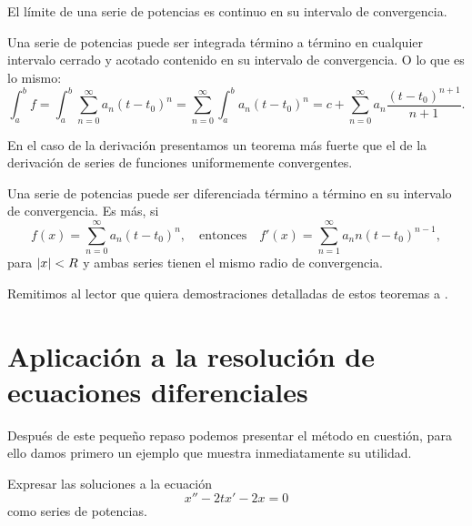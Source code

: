 \documentclass[../ecuaciones_diferenciales.tex]{subfiles}
\begin{document}
\begin{corollary}
	El límite de una serie de potencias es continuo en su intervalo de
	convergencia.
\end{corollary}

\begin{theorem}[Integración]
	Una serie de potencias puede ser integrada término a término en cualquier
	intervalo cerrado y acotado contenido en su intervalo de convergencia. O lo
	que es lo mismo:
	\[\int_a^b f = \int_a^b \sum_{n = 0}^\infty a_n (t - t_0)^n
		= \sum_{n = 0}^\infty \int_a^b a_n (t - t_0)^n
		= c + \sum_{n = 0}^\infty a_n \frac{(t - t_0)^{n + 1}}{n + 1}.\]
\end{theorem}

En el caso de la derivación presentamos un teorema más fuerte que el de la
derivación de series de funciones uniformemente convergentes.

\begin{theorem}[Diferenciación]
	Una serie de potencias puede ser diferenciada término a término en su
	intervalo de convergencia. Es más, si
	\[f(x) = \sum_{n = 0}^\infty a_n (t - t_0)^n, \quad \text{entonces} \quad
		f'(x) = \sum_{n = 1}^\infty a_n n (t - t_0)^{n - 1},\]
	para \(\abs{x} < R\) y ambas series tienen el mismo radio de convergencia.
\end{theorem}

Remitimos al lector que quiera demostraciones detalladas de estos
teoremas a \cite[capítulo~9.4]{introduction_real_analysis}.

\section{Aplicación a la resolución de ecuaciones diferenciales}

Después de este pequeño repaso podemos presentar el método en cuestión, para
ello damos primero un ejemplo que muestra inmediatamente su utilidad.
\begin{example}
	Expresar las soluciones a la ecuación
	\begin{equation} \label{eq:eqpot}
		x''-2tx'-2x=0
	\end{equation}
	como series de potencias.
\end{example}
\end{document}
